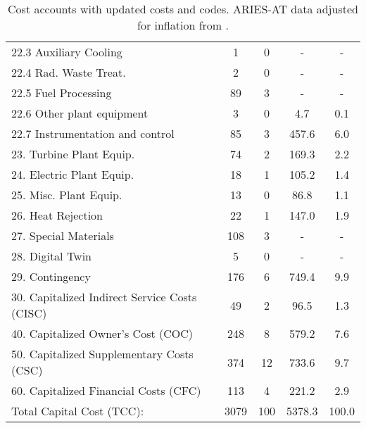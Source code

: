 \begin{table}[h!]
{\begin{tabular}{lcccc}
\hspace{10mm}22.3 Auxiliary Cooling & 1 & 0 & - & - \\
\hspace{10mm}22.4 Rad. Waste Treat. & 2 & 0 & - & - \\
\hspace{10mm}22.5 Fuel Processing & 89 & 3 & - & - \\
\hspace{10mm}22.6 Other plant equipment & 3 & 0 & 4.7 & 0.1 \\
\hspace{10mm}22.7 Instrumentation and control & 85 & 3 & 457.6 & 6.0 \\
\hspace{5mm}23. Turbine Plant Equip. & 74 & 2 & 169.3 & 2.2 \\
\hspace{5mm}24. Electric Plant Equip. & 18 & 1 & 105.2 & 1.4 \\
\hspace{5mm}25. Misc. Plant Equip. & 13 & 0 & 86.8 & 1.1 \\
\hspace{5mm}26. Heat Rejection & 22 & 1 & 147.0 & 1.9 \\
\hspace{5mm}27. Special Materials & 108 & 3 & - & - \\
\hspace{5mm}28. Digital Twin & 5 & 0 & - & - \\
\hspace{5mm}29. Contingency & 176 & 6 & 749.4 & 9.9 \\
30. Capitalized Indirect Service Costs (CISC) & 49 & 2 & 96.5 & 1.3 \\
40. Capitalized Owner’s Cost (COC) & 248 & 8 & 579.2 & 7.6 \\
50. Capitalized Supplementary Costs (CSC) & 374 & 12 & 733.6 & 9.7 \\
60. Capitalized Financial Costs (CFC) & 113 & 4 & 221.2 & 2.9 \\
\hline
Total Capital Cost (TCC): & 3079 & 100 & 5378.3 & 100.0 \\
\hline
\end{tabular}
}
\caption{Cost accounts with updated costs and codes. ARIES-AT data adjusted for inflation from \cite{gordon1986mirror}.}
\label{tab:costs_updated_codes}
\end{table}


